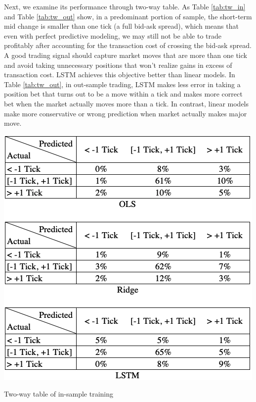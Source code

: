 \documentclass{article}
\begin{document}
Next, we examine its performance through two-way table. As Table \ref{tab:tw_in} and Table \ref{tab:tw_out} show, in a predominant portion of sample, the short-term mid change is smaller than one tick (a full bid-ask spread), which means that even with perfect predictive modeling, we may still not be able to trade profitably after accounting for the transaction cost of crossing the bid-ask spread. A good trading signal should capture market moves that are more than one tick and avoid taking unnecessary positions that won’t realize gains in excess of transaction cost. LSTM achieves this objective better than linear models. In Table \ref{tab:tw_out}, in out-sample trading, LSTM makes less error in taking a position bet that turns out to be a move within a tick and makes more correct bet when the market actually moves more than a tick. In contrast, linear models make more conservative or wrong prediction when market actually makes major move.
\begin{table}[h]
	\includegraphics[width=\linewidth]{tw_in_sample.png}
	\caption{Two-way table of in-sample training} 
	\label{tab:tw_in}
\end{table}
\end{document}
